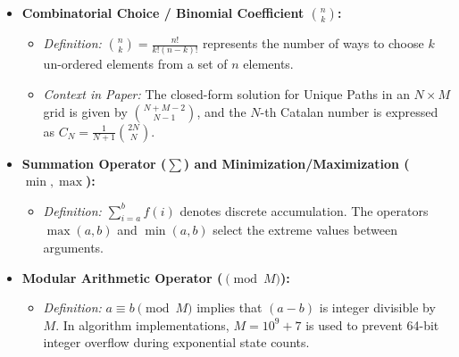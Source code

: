 \documentclass[10pt,journal,compsoc,onecolumn]{IEEEtran}
\begin{document}
\begin{itemize}
    \item \textbf{Combinatorial Choice / Binomial Coefficient $\binom{n}{k}$:}
    \begin{itemize}
        \item \emph{Definition:} $\binom{n}{k} = \frac{n!}{k!(n-k)!}$ represents the number of ways to choose $k$ un-ordered elements from a set of $n$ elements.
        \item \emph{Context in Paper:} The closed-form solution for Unique Paths in an $N \times M$ grid is given by $\binom{N+M-2}{N-1}$, and the $N$-th Catalan number is expressed as $C_N = \frac{1}{N+1}\binom{2N}{N}$.
    \end{itemize}

    \item \textbf{Summation Operator ($\sum$) and Minimization/Maximization ($\min, \max$):}
    \begin{itemize}
        \item \emph{Definition:} $\sum_{i=a}^{b} f(i)$ denotes discrete accumulation. The operators $\max(a, b)$ and $\min(a, b)$ select the extreme values between arguments.
    \end{itemize}

    \item \textbf{Modular Arithmetic Operator ($\pmod M$):}
    \begin{itemize}
        \item \emph{Definition:} $a \equiv b \pmod M$ implies that $(a - b)$ is integer divisible by $M$. In algorithm implementations, $M = 10^9 + 7$ is used to prevent 64-bit integer overflow during exponential state counts.
    \end{itemize}
\end{itemize}
\end{document}
